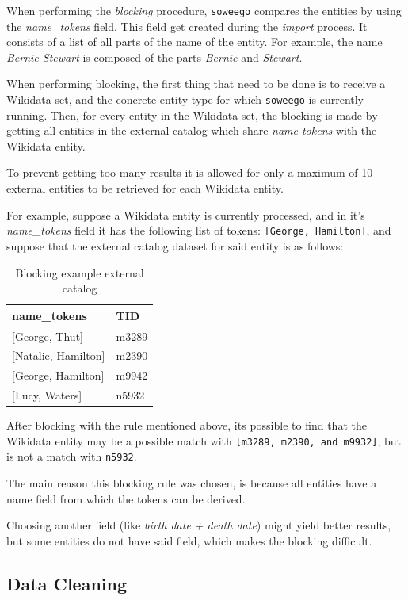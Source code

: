 \documentclass[epsfig,a4paper,11pt,titlepage,twoside,openany]{book}
\newcommand{\soweego}[0]{\texttt{soweego}\xspace}
\begin{document}
When performing the \textit{blocking} procedure, \soweego compares the entities by using the \textit{name\_tokens} field. This field get created during the \textit{import} process. It consists of a list of all parts of the name of the entity. For example, the name \textit{Bernie Stewart} is composed of the parts \textit{Bernie} and \textit{Stewart}.

When performing blocking, the first thing that need to be done is to receive a Wikidata set, and the concrete entity type for which \texttt{soweego} is currently running. Then, for every entity in the Wikidata set, the blocking is made by getting all entities in the external catalog which share \textit{name tokens} with the Wikidata entity. 

To prevent getting too many results it is allowed for only a maximum of 10 external entities to be retrieved for each Wikidata entity.

For example, suppose a Wikidata entity is  currently processed, and in it's \textit{name\_tokens} field it has the following list of tokens: \texttt{[George, Hamilton]}, and suppose that the external catalog dataset for said entity is as follows:

\begin{table}[H]
\centering
\begin{tabular}{l|l}
name\_tokens        & TID   \\ \hline
{[George, Thut]}      & m3289 \\
{[Natalie, Hamilton]} & m2390 \\
{[George, Hamilton]}  & m9942 \\
{[Lucy, Waters]}      & n5932
\end{tabular}
\caption{Blocking example external catalog}
\label{tab:soweego-blocking-ex}
\end{table}

After blocking with the rule mentioned above, its possible to find that the Wikidata entity may be a possible match with \texttt{[m3289, m2390, and m9932]}, but is not a match with \texttt{n5932}.

The main reason this blocking rule was chosen, is because all entities have a name field from which the tokens can be derived.  

Choosing another field (like \textit{birth date + death date}) might yield better results, but some entities do not have said field, which makes the blocking difficult. 

\subsection{Data Cleaning}
\label{sec:soweego-st-data-cleaning}
\end{document}
